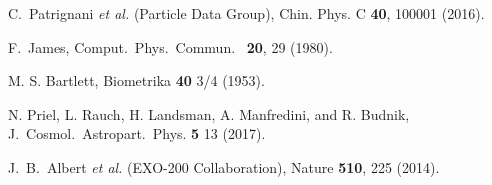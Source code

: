 \begin{thebibliography}{24}
 C.~Patrignani {\it et al.} (Particle Data Group), Chin. Phys. C \textbf{40}, 100001 (2016).

 F.~James, Comput.\ Phys.\ Commun.\  \textbf{ 20}, 29 (1980).


 M. S. Bartlett, Biometrika \textbf{40} 3/4 (1953).

 N. Priel, L. Rauch, H. Landsman, A. Manfredini, and R. Budnik, J.\ Cosmol.\ Astropart.\ Phys. \textbf{5} 13 (2017). 

 J.~B.~Albert {\it et al.} (EXO-200 Collaboration), Nature \textbf{510}, 225 (2014). 

\end{thebibliography}